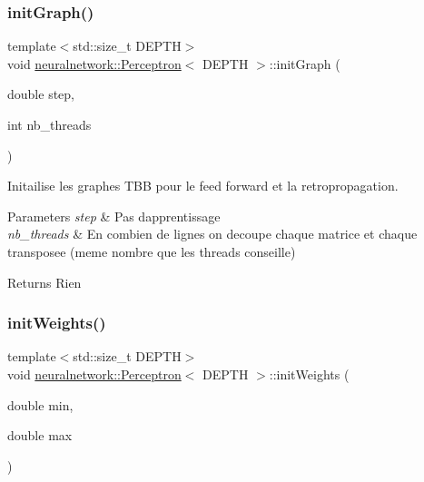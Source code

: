 \subsubsection{\texorpdfstring{init\+Graph()}{initGraph()}}
{\footnotesize\ttfamily template$<$std\+::size\+\_\+t D\+E\+P\+TH$>$ \\
void \mbox{\hyperlink{classneuralnetwork_1_1_perceptron}{neuralnetwork\+::\+Perceptron}}$<$ D\+E\+P\+TH $>$\+::init\+Graph (\begin{DoxyParamCaption}\item[{double}]{step,  }\item[{int}]{nb\+\_\+threads }\end{DoxyParamCaption})}



Initailise les graphes T\+BB pour le feed forward et la retropropagation. 


\begin{DoxyParams}{Parameters}
{\em step} & Pas d\textquotesingle{}apprentissage \\
\hline
{\em nb\+\_\+threads} & En combien de lignes on decoupe chaque matrice et chaque transposee (meme nombre que les threads conseille) \\
\hline
\end{DoxyParams}
\begin{DoxyReturn}{Returns}
Rien 
\end{DoxyReturn}
\mbox{\label{classneuralnetwork_1_1_perceptron_a82ed55bb881ead0fd7bb8b37a870fd98}} 
\subsubsection{\texorpdfstring{init\+Weights()}{initWeights()}}
{\footnotesize\ttfamily template$<$std\+::size\+\_\+t D\+E\+P\+TH$>$ \\
void \mbox{\hyperlink{classneuralnetwork_1_1_perceptron}{neuralnetwork\+::\+Perceptron}}$<$ D\+E\+P\+TH $>$\+::init\+Weights (\begin{DoxyParamCaption}\item[{double}]{min,  }\item[{double}]{max }\end{DoxyParamCaption})}



